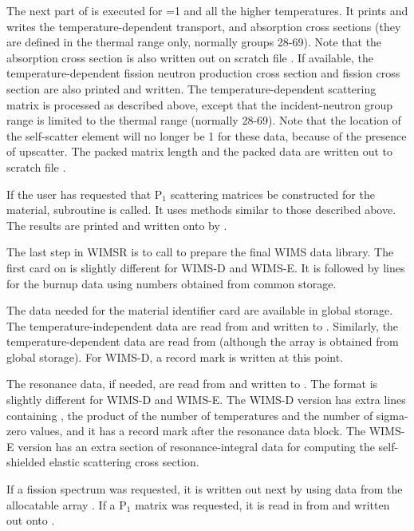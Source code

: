 The next part of  is executed for =1
and all the higher temperatures.  It prints and writes the
temperature-dependent transport, and absorption cross sections
(they are defined in the thermal range only, normally groups
28-69).  Note that the absorption cross section is also written
out on scratch file .  If available, the
temperature-dependent fission neutron production cross section and
fission cross section are also printed and written.  The
temperature-dependent scattering matrix is processed as described
above, except that the incident-neutron group range is limited to
the thermal range (normally 28-69).  Note that the location of the
self-scatter element will no longer be 1 for these data, because of
the presence of upscatter.  The packed matrix length and the packed
data are written out to scratch file .

If the user has requested that P$_1$ scattering matrices be
constructed for the material, subroutine  is called.
It uses methods similar to those described above.  The results
are printed and written onto  by .

The last step in WIMSR is to call  to prepare the
final WIMS data library.  The first card on  is slightly
different for WIMS-D and WIMS-E.  It is followed by lines for
the burnup data using numbers obtained from common storage.

The data needed for the material identifier card are available
in global storage.  The temperature-independent data are read from
 and written to .  Similarly, the
temperature-dependent data are read from 
(although the  array is obtained from global storage).
For WIMS-D, a record mark is written at this point.

The resonance data, if needed, are read from  and written
to .  The format is slightly different for WIMS-D and WIMS-E.
The WIMS-D version has extra lines containing , the product
of the number of temperatures and the number of sigma-zero values, and
it has a record mark after the resonance data block.  The WIMS-E
version has an extra section of resonance-integral data for computing
the self-shielded elastic scattering cross section.

If a fission spectrum was requested, it is written out next by
using data from the allocatable array .  If a P$_1$ matrix
was requested, it is read in from  and written out
onto .

